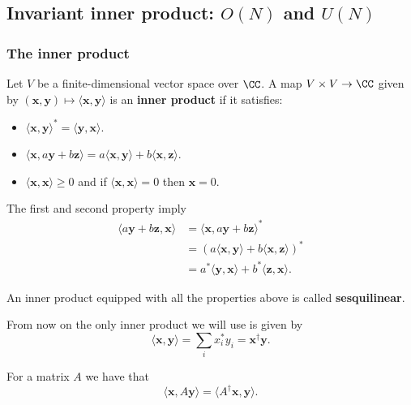 \documentclass[12pt, a4paper]{article}
\begin{document}
\subsection{Invariant inner product: \texorpdfstring{\(O(N)\)}{TEXT} and \texorpdfstring{\(U(N)\)}{TEXT}}

\subsubsection{The inner product}

\begin{definition}
    Let \(V\) be a finite-dimensional vector space over \(\CC\). A map \(V \times V \to \CC\) given by \((\bm{x},\bm{y}) \mapsto \langle \bm{x}, \bm{y} \rangle\) is an \textbf{inner product} if it satisfies:
    \begin{itemize}
        \item \(\langle \bm{x}, \bm{y} \rangle^* =\langle \bm{y}, \bm{x} \rangle\).
        \item \(\langle \bm{x}, a\bm{y}+b\bm{z} \rangle = a \langle \bm{x}, \bm{y} \rangle +b\langle \bm{x}, \bm{z} \rangle\).
        \item \(\langle \bm{x}, \bm{x} \rangle \geq 0\) and if \(\langle \bm{x}, \bm{x} \rangle =0\) then \(\bm{x}=0\).
    \end{itemize}
\end{definition}

\begin{corollary}
    The first and second property imply
    \[\begin{aligned}
        \langle a\bm{y}+b\bm{z}, \bm{x} \rangle &= \langle \bm{x}, a\bm{y}+b\bm{z} \rangle^* \\
        &= \left( a\langle \bm{x},\bm{y} \rangle +b \langle \bm{x}, \bm{z} \rangle \right)^* \\
        &= a^* \langle \bm{y}, \bm{x} \rangle +b^* \langle \bm{z},\bm{x} \rangle.
    \end{aligned}\]
\end{corollary}

\begin{definition}
    An inner product equipped with all the properties above is called \textbf{sesquilinear}.
\end{definition}

From now on the only inner product we will use is given by
\[\langle \bm{x}, \bm{y} \rangle = \sum_i x_i^* y_i =\bm{x}^{\dagger}\bm{y}.\]

\begin{mdcor}
    For a matrix \(A\) we have that 
    \[\langle \bm{x}, A\bm{y} \rangle = \langle A^{\dagger}\bm{x}, \bm{y} \rangle.\]
\end{mdcor}
\end{document}
